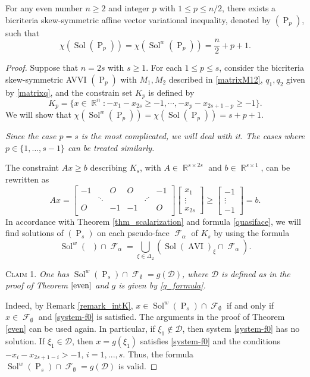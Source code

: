 \documentclass[smallextended,envcountsect]{svjour3}       %
\DeclareMathOperator{\Sol}{Sol}
\DeclareMathOperator{\AVI}{AVI}
\DeclareMathOperator{\Pa}{P}
\DeclareMathOperator{\Ptwo}{P_s}
\DeclareMathOperator{\R}{\mathbb{R}}
\DeclareMathOperator{\F}{\mathcal{F}}
\begin{document}
\begin{theorem}\label{evenn1} For any even number $n\geq 2$ and integer $p$ with $1 \leq p \leq n/2$, there exists a bicriteria skew-symmetric affine vector variational inequality, denoted by  $(\Pa_p)$, such that
$$\chi(\Sol(\Pa_p))=  \chi(\Sol^w(\Pa_p))= \frac{n}{2}+p+1.$$
\end{theorem}

\begin{proof} Suppose that $n=2s$ with $s\geq 1$. For each $1 \leq p \leq s$, consider the bicriteria skew-symmetric AVVI $(\Pa_p)$ with $M_1,M_2$ described in \eqref{matrixM12}, $q_1,q_2$ given by \eqref{matrixq}, and the constrain set $K_p$ is defined by
	$$K_p=\{x\in \R^n:-x_1-x_{2s}\geq -1, \cdots, -x_p-x_{2s+1-p}\geq -1\}.$$
We will show that  $\chi(\Sol^w(\Pa_p))=\chi(\Sol(\Pa_p))=s+p+1$. 

\textit{Since the case $p=s$ is the most complicated, we will deal with it. The cases where $p\in\{1,\dots, s-1\}$ can be treated similarly.}

The constraint $Ax\geq b$ describing $K_s$, with $A\in \R^{s\times 2s}$ and $b\in \R^{s\times 1}$, can be rewritten as 
	$$	Ax=\begin{bmatrix}
-1 &  & O & O&  &-1 \\ 
	 &  \ddots  &   & &\iddots& \\ 
	O&   & -1   &-1& & O\\ 
	\end{bmatrix}\begin{bmatrix}
	x_1 \\ 
	\vdots\\
	x_{2s}
	\end{bmatrix}\geq \begin{bmatrix}
	-1 \\ 
	\vdots\\
	-1
	\end{bmatrix}=b.$$
In accordance with Theorem \ref{thm_scalarization} and formula \eqref{quasiface}, we will find solutions of $(\Pa_s)$ on each pseudo-face $\F_{\alpha}$ of $K_s$ by using the formula
 $$\Sol^w(\Ptwo)\cap \F_{\alpha}=\bigcup_{\xi\in \Delta_2}({\Sol(\AVI)}_\xi\cap \F_{\alpha}).$$
 
\noindent \textsc{Claim 1.} \textit{One has $\Sol^w(\Pa_s)\cap \F_{\emptyset}=g(\mathcal{D})$, where $\mathcal{D}$ is defined as in the proof of Theorem $\ref{even}$ and $g$ is given by \eqref{g_formula}.}

\smallskip
Indeed, by Remark \ref{remark_intK}, $x\in \Sol^w(\Pa_s) \cap \F_{\emptyset}$ if and only if $x\in\F_{\emptyset}$ and \eqref{system-f0} is satisfied. The arguments in the proof of Theorem \ref{even} can be used again. In particular, if $\xi_1\notin \mathcal{D}$, then system \eqref{system-f0} has no solution. If $\xi_1\in \mathcal{D}$, then $x=g(\xi_1)$ satisfies \eqref{system-f0} and the conditions $-x_i-x_{2s+1-i}>-1$, $i=1,...,s$. Thus, the formula $\Sol^w(\Pa_s)\cap \F_{\emptyset}=g(\mathcal{D})$ is valid.


\end{proof}
\end{document}
